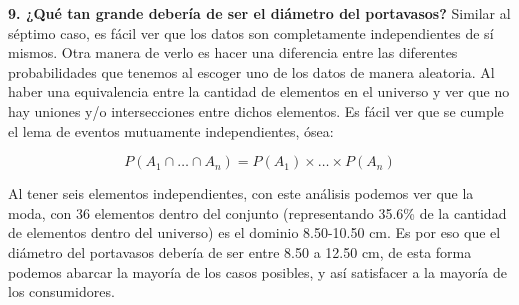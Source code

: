 \textbf{9. ¿Qué tan grande debería de ser el diámetro del portavasos?}
Similar al séptimo caso, es fácil ver que los datos son completamente independientes de sí mismos. Otra manera de verlo es hacer una diferencia entre las diferentes probabilidades que tenemos al escoger uno de los datos de manera aleatoria. Al haber una equivalencia entre la cantidad de elementos en el universo y ver que no hay uniones y/o intersecciones entre dichos elementos. Es fácil ver que se cumple el lema de eventos mutuamente independientes, ósea:

\begin{equation}
P(A_1\cap \dots \cap A_n)=P(A_1)\times \dots \times P(A_n) 
\end{equation}

Al tener seis elementos independientes, con este análisis podemos ver que la moda, con 36 elementos dentro del conjunto (representando 35.6\% de la cantidad de elementos dentro del universo) es el dominio 8.50-10.50 cm. Es por eso que el diámetro del portavasos debería de ser entre 8.50 a 12.50 cm, de esta forma podemos abarcar la mayoría de los casos posibles, y así satisfacer a la mayoría de los consumidores.